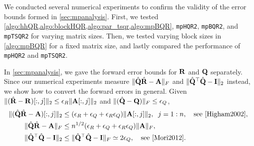 We conducted several numerical experiments to confirm the validity of the error bounds formed in \cref{sec:mpanalysis}.
First, we tested \cref{algo:hhQR,algo:blockHQR,algo:par_tsqr,algo:mpBQR}, {\tt mpHQR2}, {\tt mpBQR2}, and {\tt mpTSQR2} for varying matrix sizes.
Then, we tested varying block sizes in \cref{algo:mpBQR} for a fixed matrix size, and lastly compared the performance of {\tt mpHQR2} and {\tt mpTSQR2}.\par

In \cref{sec:mpanalysis}, we gave the forward error bounds for $\mathbf{R}$ and $\mathbf{Q}$ separately. 
Since our numerical experiments measure $\|\hat{\mathbf{Q}}\hat{\mathbf{R}}-\mathbf{A}\|_F$ and $\|\hat{\mathbf{Q}}^{\top}\hat{\mathbf{Q}}-\mathbf{I}\|_2$ instead, we show how to convert the forward errors in general.
Given $\|(\hat{\mathbf{R}}-\mathbf{R})[:,j]\|_2\leq \epsilon_R \|\mathbf{A}[:,j]\|_2$ and $\|(\hat{\mathbf{Q}}-\mathbf{Q})\|_F\leq \epsilon_Q$,
\begin{align}
	\|(\hat{\bb{Q}}\hat{\bb{R}}-\bb{A})[:,j]\|_2 &\leq (\epsilon_R+\epsilon_Q + \epsilon_R\epsilon_Q)\|\bb{A}[:,j]\|_2,\;\; j=1:n,\quad \text{see \cite{Higham2002}},\\
	\|\hat{\bb{Q}}\hat{\bb{R}}-\bb{A}\|_F &\leq n^{1/2}(\epsilon_R+\epsilon_Q + \epsilon_R\epsilon_Q)\|\bb{A}\|_F, \label{eqn:QRA} \\
	\|\hat{\bb{Q}}^{\top}\hat{\bb{Q}}-\bb{I}\|_2 &\leq \|\hat{\bb{Q}}^{\top}\hat{\bb{Q}}-\bb{I}\|_F \simeq 2\epsilon_Q,\quad\text{see \cite{Mori2012}} \label{eqn:QQI}.
\end{align}

